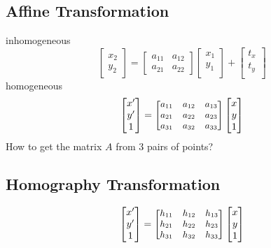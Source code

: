 \subsection{Affine Transformation}
inhomogeneous
\[\begin{bmatrix}
  x_2\\
  y_2
\end{bmatrix}=
\begin{bmatrix}
  a_{11} & a_{12}\\
  a_{21} & a_{22}
\end{bmatrix}
\begin{bmatrix}
  x_1\\
  y_1\\
\end{bmatrix}+
\begin{bmatrix}
  t_x\\
  t_y\\
\end{bmatrix}
\]
homogeneous
\[\begin{bmatrix}
  x'\\
  y'\\
  1
\end{bmatrix}=
{\small
\begin{bmatrix}
  a_{11} & a_{12} & a_{13}\\
  a_{21} & a_{22} & a_{23}\\
  a_{31} & a_{32} & a_{33}
\end{bmatrix}
}
\begin{bmatrix}
  x\\
  y\\
  1
\end{bmatrix}
\]
How to get the matrix $A$ from 3 pairs of points?
\subsection{Homography Transformation}
\[\begin{bmatrix}
  x'\\
  y'\\
  1
\end{bmatrix}=
{\small
\begin{bmatrix}
  h_{11} & h_{12} & h_{13}\\
  h_{21} & h_{22} & h_{23}\\
  h_{31} & h_{32} & h_{33}
\end{bmatrix}
}
\begin{bmatrix}
  x\\
  y\\
  1
\end{bmatrix}
\]
